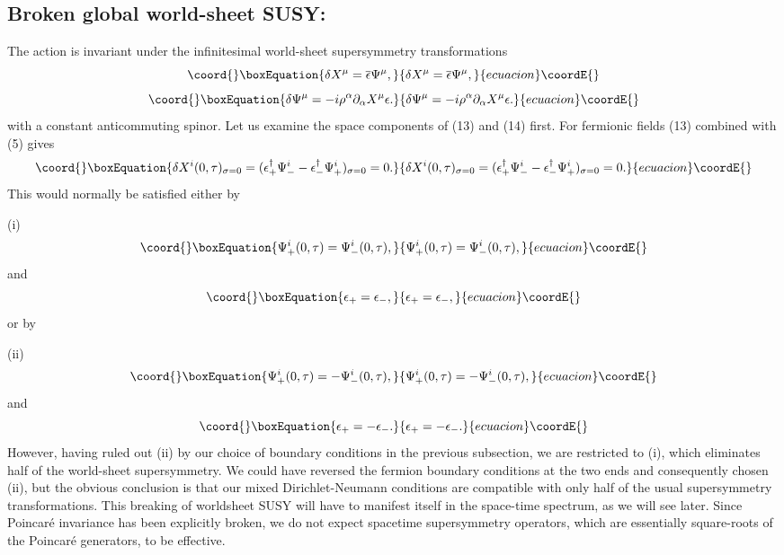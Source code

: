\documentclass[a4paper,a4paper]{article}
\begin{document}
\subsection{Broken global world-sheet SUSY:}
The action is invariant under the infinitesimal world-sheet
supersymmetry transformations
\begin{equation}\coord{}\boxEquation{
\delta X^{\mu}=\overline{\epsilon}\Psi^{\mu},
}{
\delta X^{\mu}=\overline{\epsilon}\Psi^{\mu},
}{ecuacion}\coordE{}\end{equation}
\begin{equation}\coord{}\boxEquation{
\delta\Psi^{\mu}=-i\rho^{\alpha}\partial_{\alpha}X^{\mu}\epsilon.
}{
\delta\Psi^{\mu}=-i\rho^{\alpha}\partial_{\alpha}X^{\mu}\epsilon.
}{ecuacion}\coordE{}\end{equation}
with \myHighlight{$\epsilon$}\coordHE{} a constant anticommuting spinor. Let us examine
the space components of (13) and (14) first. For fermionic fields
(13) combined with (5) gives
\begin{equation}\coord{}\boxEquation{
\delta X^{i}(0,\tau)_{\sigma = 0} =
(\epsilon_{+}^{\dag}\Psi_{-}^{i}-\epsilon_{-}^{\dag}
\Psi_{+}^{i})_{\sigma=0}=0.
}{
\delta X^{i}(0,\tau)_{\sigma = 0} =
(\epsilon_{+}^{\dag}\Psi_{-}^{i}-\epsilon_{-}^{\dag}
\Psi_{+}^{i})_{\sigma=0}=0.
}{ecuacion}\coordE{}\end{equation}
This would normally be satisfied either by

(i)
\begin{equation}\coord{}\boxEquation{
\Psi_{+}^{i}(0,\tau)=\Psi_{-}^{i}(0,\tau),
}{
\Psi_{+}^{i}(0,\tau)=\Psi_{-}^{i}(0,\tau),
}{ecuacion}\coordE{}\end{equation}
and
\begin{equation}\coord{}\boxEquation{
\epsilon_{+}=\epsilon_{-},
}{
\epsilon_{+}=\epsilon_{-},
}{ecuacion}\coordE{}\end{equation}
or by

(ii)
\begin{equation}\coord{}\boxEquation{
\Psi_{+}^{i}(0,\tau)=-\Psi_{-}^{i}(0,\tau),
}{
\Psi_{+}^{i}(0,\tau)=-\Psi_{-}^{i}(0,\tau),
}{ecuacion}\coordE{}\end{equation}
and
\begin{equation}\coord{}\boxEquation{
\epsilon_{+}=-\epsilon_{-}.
}{
\epsilon_{+}=-\epsilon_{-}.
}{ecuacion}\coordE{}\end{equation}
However, having ruled out (ii) by our choice of boundary
conditions in the previous subsection, we are restricted to (i),
which eliminates half of the world-sheet supersymmetry.  We could
have reversed the fermion boundary conditions at the two ends and
consequently chosen (ii), but the obvious conclusion is that our
mixed Dirichlet-Neumann conditions are compatible with only half
of the usual supersymmetry transformations.  This breaking of
worldsheet SUSY will have to manifest itself in the space-time
spectrum, as we will see later.  Since Poincar\'{e} invariance has
been explicitly broken, we do not expect spacetime supersymmetry
operators, which are essentially square-roots of the Poincar\'{e}
generators, to be effective.
\end{document}
